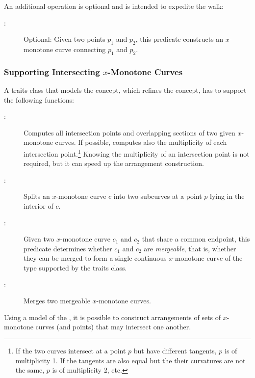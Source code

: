 An additional operation is optional and is intended to expedite the
walk:
\begin{description}
\item[:] Optional: Given two points $p_1$ and
  $p_2$, this predicate constructs an $x$-monotone curve connecting
  $p_1$ and $p_2$.
\end{description}

\subsubsection{Supporting Intersecting $x$-Monotone Curves
\label{arr_sssec:tr_xmon_concept}}

A traits class that models the 
concept, which refines the 
concept, has to support the following functions:
\begin{description}
\item[:]
  Computes all intersection points and overlapping sections of
  two given $x$-monotone curves. If possible, computes also the
  multiplicity of each intersection point.\footnote{If the two
    curves intersect at a point $p$ but have different tangents, $p$
    is of multiplicity 1. If the tangents are also equal but the their
    curvatures are not the same, $p$ is of multiplicity 2, etc.}
  Knowing the multiplicity of an intersection point is not required,
  but it can speed up the arrangement construction.
%
\item[:] Splits an $x$-monotone curve $c$ into two subcurves
  at a point $p$ lying in the interior of $c$.
%
\item[:] Given two $x$-monotone curve $c_1$ and
  $c_2$ that share a common endpoint, this predicate determines
  whether $c_1$ and $c_2$ are \emph{mergeable}, that is, whether they
  can be merged to form a single continuous $x$-monotone curve of the
  type supported by the traits class.
%
\item[:] Merges two mergeable $x$-monotone curves.
\end{description}
Using a model of the , it is
possible to construct arrangements of sets of $x$-monotone curves
(and points) that may intersect one another.

